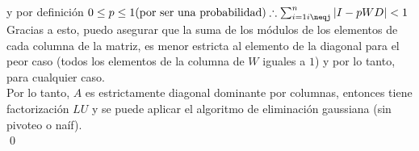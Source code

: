 		y por definición $0 \leq p \leq 1 \text{(por ser una probabilidad)} \therefore \sum_{i=1\\i\neqj}^{n} |I-pWD| < 1$ \\

		Gracias a esto, puedo asegurar que la suma de los módulos de los elementos de cada columna de la matriz, es menor estricta al elemento de la diagonal para el peor caso (todos los elementos de la columna de $W$ iguales a $1$) y por lo tanto, para cualquier caso. \\

		Por lo tanto, $A$ es estrictamente diagonal dominante por columnas, entonces tiene factorización $LU$ y se puede aplicar el algoritmo de eliminación gaussiana (sin pivoteo o naíf). \\

		\qed

	\clearpage

